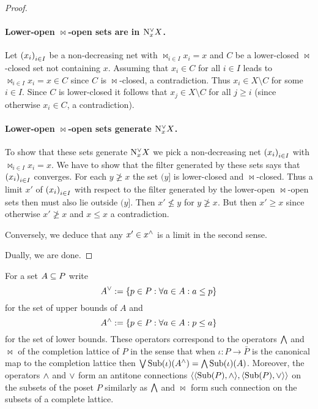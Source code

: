 \documentclass[8pt,a4paper]{article}
\begin{document}
\begin{proof}
    \paragraph{Lower-open $\Join$-open sets are in $\mathrm{N}^{\vee}_x X$.}
    Let $\seq{x_i}_{i\in I}$ be a non-decreasing net with $\Join_{i\in I}{x_i}=x$ and $C$ be a lower-closed $\Join$-closed set not containing $x$. Assuming that $x_i\in C$ for all $i\in I$ leads to $\Join_{i\in I}{x_i}=x\in C$ since $C$ is $\Join$-closed, a contradiction. Thus $x_i\in X\setminus C$ for some $i\in I$. Since $C$ is lower-closed it follows that $x_j\in X\setminus C$ for all $j\geq i$ (since otherwise $x_i\in C$, a contradiction).

    \paragraph{Lower-open $\Join$-open sets generate $\mathrm{N}^{\vee}_x X$.}
    To show that these sets generate $\mathrm{N}^{\vee}_x X$ we pick a non-decreasing net $\seq{x_i}_{i\in I}$ with $\Join_{i\in I}{x_i}=x$. We have to show that the filter generated by these sets says that $\seq{x_i}_{i\in I}$ converges. For each $y\not\geq x$ the set $(y]$ is lower-closed and $\Join$-closed. Thus a limit $x'$ of $\seq{x_i}_{i\in I}$ with respect to the filter generated by the lower-open $\Join$-open sets then must also lie outside $(y]$. Then $x'\not\leq y$ for $y\not\geq x$.
But then $x'\geq x$ since otherwise $x'\not\geq x$ and $x\leq x$ a contradiction.

Conversely, we deduce that any $x'\in x^{\wedge}$ is a limit in the second sense.

Dually, we are done.
\end{proof}

\begin{definition}
    
\end{definition}%

%
\begin{definition}
    For a set $A\subseteq P$ write
    $$A^{\join}:=\set{p\in P: \forall a\in A: a\leq p}$$
    for the set of upper bounds of $A$ and
    $$A^{\meet}:=\set{p\in P}[\forall a\in A: p\leq a]$$
    for the set of lower bounds. These operators correspond to the operators $\mathop\mathrm{\bigwedge}$ and $\Join$ of the completion lattice of $P$ in the sense that when $\iota:P\to \bar{P}$ is the canonical map to the completion lattice then $\mathop\mathrm{\bigvee}\mathop{\mathrm{Sub}}\nolimits(\iota)(A^{\wedge})=\mathop\mathrm{\bigwedge}\mathop{\mathrm{Sub}}\nolimits(\iota)(A)$. Moreover, the operators $\wedge$ and $\vee$ form an antitone  connections $\struct{\struct{\Sub(P),\meet},\struct{\Sub(P),\join}}$ on the subsets of the poset $P$ similarly as $\mathop\mathrm{\bigwedge}$ and $\Join$ form such connection on the subsets of a complete lattice. 
\end{definition}
\end{document}
